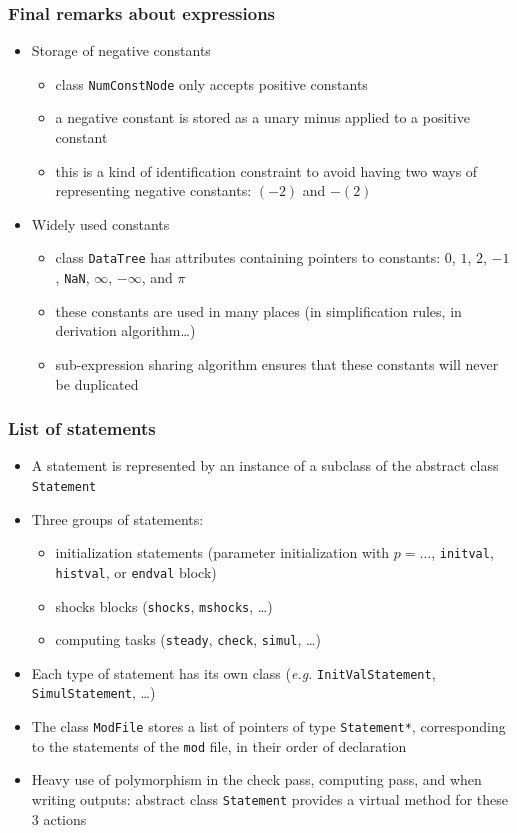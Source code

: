 \documentclass{beamer}
\begin{document}
\begin{frame}
  \frametitle{Final remarks about expressions}
  \begin{itemize}
  \item Storage of negative constants
    \begin{itemize}
    \item class \texttt{NumConstNode} only accepts positive constants
    \item a negative constant is stored as a unary minus applied to a positive constant
    \item this is a kind of identification constraint to avoid having two ways of representing negative constants: $(-2)$ and $-(2)$
    \end{itemize}
  \item Widely used constants
    \begin{itemize}
    \item class \texttt{DataTree} has attributes containing pointers to constants: $0$, $1$, $2$, $-1$, \texttt{NaN}, $\infty$, $-\infty$, and $\pi$
    \item these constants are used in many places (in simplification rules, in derivation algorithm\ldots)
    \item sub-expression sharing algorithm ensures that these constants will never be duplicated
    \end{itemize}
  \end{itemize}
\end{frame}

\begin{frame}
  \frametitle{List of statements}
  \begin{itemize}
  \item A statement is represented by an instance of a subclass of the abstract class \texttt{Statement}
  \item Three groups of statements:
    \begin{itemize}
    \item initialization statements (parameter initialization with $p = \ldots$, \texttt{initval}, \texttt{histval}, or \texttt{endval} block)
    \item shocks blocks (\texttt{shocks}, \texttt{mshocks}, \ldots)
    \item computing tasks (\texttt{steady}, \texttt{check}, \texttt{simul}, \ldots)
    \end{itemize}
  \item Each type of statement has its own class (\textit{e.g.} \texttt{InitValStatement}, \texttt{SimulStatement}, \ldots)
  \item The class \texttt{ModFile} stores a list of pointers of type \texttt{Statement*}, corresponding to the statements of the \texttt{mod} file, in their order of declaration
  \item Heavy use of polymorphism in the check pass, computing pass, and when writing outputs: abstract class \texttt{Statement} provides a virtual method for these 3 actions
  \end{itemize}
\end{frame}
\end{document}
